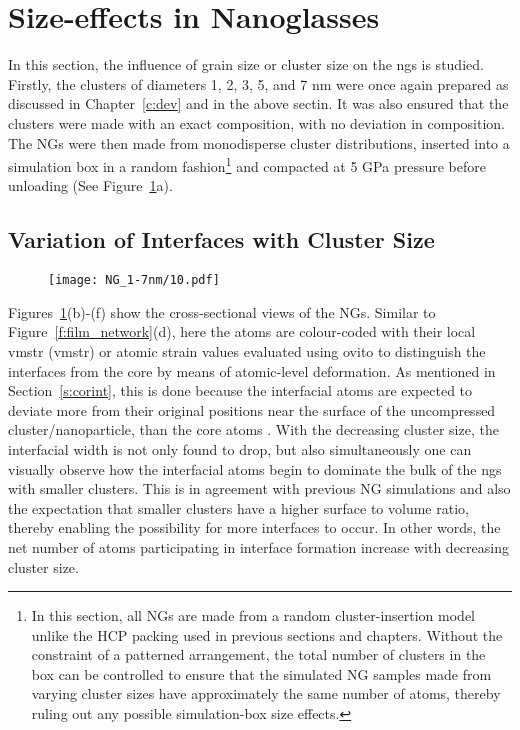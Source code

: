 \section{Size-effects in Nanoglasses}
In this section, the influence of grain size or cluster size on the \gls{ng}s is studied. Firstly, the clusters of diameters 1, 2, 3, 5, and 7 nm were once again prepared as discussed in Chapter~\ref{c:dev} and in the above sectin. It was also ensured that the clusters were made with an exact \cz composition, with no deviation in composition. The NGs were then made from monodisperse cluster distributions, inserted into a simulation box in a random fashion\footnote{In this section, all NGs are made from a random cluster-insertion model unlike the HCP packing used in previous sections and chapters. Without the constraint of a patterned arrangement, the total number of clusters in the box can be controlled to ensure that the simulated NG samples made from varying cluster sizes have approximately the same number of atoms, thereby ruling out any possible simulation-box size effects.} and compacted at 5 GPa pressure before unloading (See Figure~\ref{f:NGintersiz}a).   \par

\subsection{Variation of Interfaces with Cluster Size}

\begin{figure}[!h]
	\texttt{[image: NG\_1-7nm/10.pdf]}
	\label{f:NGintersiz}
\end{figure}

Figures~\ref{f:NGintersiz}(b)-(f) show the cross-sectional views of the NGs. Similar to Figure~\ref{f:film_network}(d), here the atoms are colour-coded with their local \glsdesc{vmstr} (\gls{vmstr}) or atomic strain values evaluated using \gls{ovito} \cite{Stukowski2014} to distinguish the interfaces from the core by means of atomic-level deformation. As mentioned in Section~\ref{s:corint}, this is done because the interfacial atoms are expected to deviate more from their original positions near the surface of the uncompressed cluster/nanoparticle, than the core atoms \cite{Gleiter1991}. With the decreasing cluster size, the interfacial width is not only found to drop, but also simultaneously one can visually observe how the interfacial atoms begin to dominate the bulk of the \gls{ng}s with smaller clusters. This is in agreement with previous NG simulations \cite{Cheng2019a} and also the expectation that smaller clusters have a higher surface to volume ratio, thereby enabling the possibility for more interfaces to occur. In other words, the net number of atoms participating in interface formation increase with decreasing cluster size. \par

